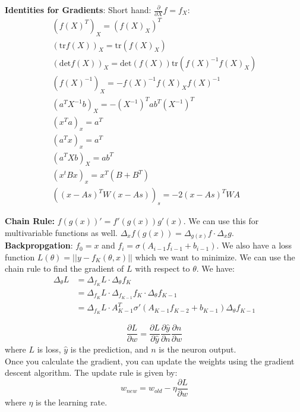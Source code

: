 \documentclass[answers,12pt,addpoints]{exam}
\begin{document}
\textbf{Identities for Gradients}: Short hand: $\frac{\partial}{\partial X} f = f_X$:
\begin{align*}
    (f(X)^T)_X = (f(X)_X)^T \\
    (\text{tr}f(X))_X = \text{tr}(f(X)_X) \\
    (\text{det}f(X))_X = \text{det}(f(X))\text{tr}(f(X)^{-1} f(X)_X) \\
    (f(X)^{-1})_X = -f(X)^{-1} f(X)_X f(X)^{-1} \\
    (a^T X^{-1}b)_X = -(X^{-1})^T ab^T (X^{-1})^T\\
    (x^T a)_x = a^T \\
    (a^T x)_x = a^T\\
    (a^T X b)_X = ab^T \\
    (x^t B x)_x = x^T(B + B^T)\\
    ((x-As)^T W (x-As))_s = -2(x-As)^T W A 
\end{align*}

\textbf{Chain Rule:} $f(g(x))'  = f'(g(x))g'(x)$. We can use this for multivariable functions as well. $\Delta_x f(g(x)) = \Delta_{g(x)} f \cdot \Delta_x g$.\\

\textbf{Backpropgation}: $f_0 =x$ and $f_i = \sigma(A_{i-1}f_{i-1} + b_{i-1})$. We also have a loss function $L(\theta) = ||y - f_K(\theta, x)||$ which we want to minimize. We can use the chain rule to find the gradient of $L$ with respect to $\theta$. We have:
\begin{align*}
    \Delta_{\theta} L &= \Delta_{f_K} L \cdot \Delta_{\theta} f_K \\
    &= \Delta_{f_K} L \cdot \Delta_{f_{K-1}} f_K \cdot \Delta_{\theta} f_{K-1} \\
    &= \Delta_{f_K} L \cdot A_{K-1}^T \sigma'(A_{K-1}f_{K-2} + b_{K-1})\Delta_{\theta} f_{K-1}
\end{align*}
\begin{example}
    $$\frac{\partial L}{\partial w} = \frac{\partial L}{\partial \hat{y}} \frac{\partial \hat{y}}{\partial n} \frac{\partial n}{\partial w}$$ where $L$ is loss, $\hat{y}$ is the prediction, and $n$ is the neuron output. \\
    Once you calculate the gradient, you can update the weights using the gradient descent algorithm. The update rule is given by:
    $$w_{new} = w_{old} - \eta \frac{\partial L}{\partial w}$$
    where $\eta$ is the learning rate.
\end{example}
\end{document}
